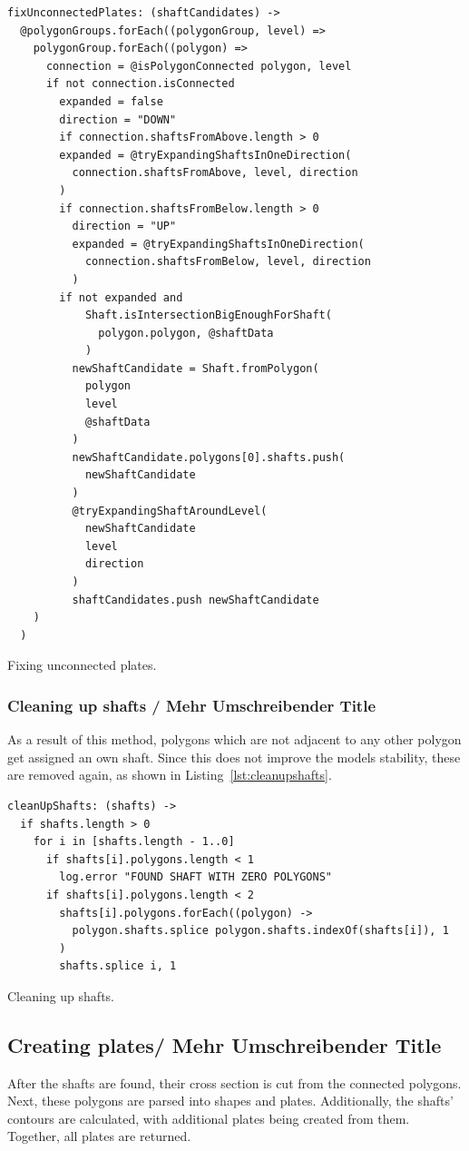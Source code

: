 \documentclass[../ClassicThesis.tex]{subfiles}
\begin{document}
\begin{listing}
\begin{verbatim}
fixUnconnectedPlates: (shaftCandidates) ->
  @polygonGroups.forEach((polygonGroup, level) =>
    polygonGroup.forEach((polygon) =>
      connection = @isPolygonConnected polygon, level
      if not connection.isConnected
        expanded = false
        direction = "DOWN"
        if connection.shaftsFromAbove.length > 0
        expanded = @tryExpandingShaftsInOneDirection(
          connection.shaftsFromAbove, level, direction
        )
        if connection.shaftsFromBelow.length > 0
          direction = "UP"
          expanded = @tryExpandingShaftsInOneDirection(
            connection.shaftsFromBelow, level, direction
          )
        if not expanded and 
            Shaft.isIntersectionBigEnoughForShaft(
              polygon.polygon, @shaftData
            )
          newShaftCandidate = Shaft.fromPolygon(
            polygon
            level
            @shaftData
          )
          newShaftCandidate.polygons[0].shafts.push(
            newShaftCandidate
          )
          @tryExpandingShaftAroundLevel(
            newShaftCandidate
            level
            direction
          )
          shaftCandidates.push newShaftCandidate
    )
  )
\end{verbatim}
\caption{Fixing unconnected plates.}
\label{lst:fixunconnected}
\end{listing}

\subsubsection{Cleaning up shafts / Mehr Umschreibender Title}

As a result of this method, polygons which are not adjacent to any other polygon get assigned an own shaft. Since this does not improve the models stability, these are removed again, as shown in Listing~\ref{lst:cleanupshafts}.

\begin{listing}
\begin{verbatim}
cleanUpShafts: (shafts) ->
  if shafts.length > 0
    for i in [shafts.length - 1..0]
      if shafts[i].polygons.length < 1
        log.error "FOUND SHAFT WITH ZERO POLYGONS"
      if shafts[i].polygons.length < 2
        shafts[i].polygons.forEach((polygon) ->
          polygon.shafts.splice polygon.shafts.indexOf(shafts[i]), 1
        )
        shafts.splice i, 1
\end{verbatim}
\caption{Cleaning up shafts.}
\label{lst:cleanupshafts}
\end{listing}

\subsection{Creating plates/ Mehr Umschreibender Title}

After the shafts are found, their cross section is cut from the connected polygons. Next, these polygons are parsed into shapes and plates. Additionally, the shafts' contours are calculated, with additional plates being created from them. Together, all plates are returned.
\end{document}
